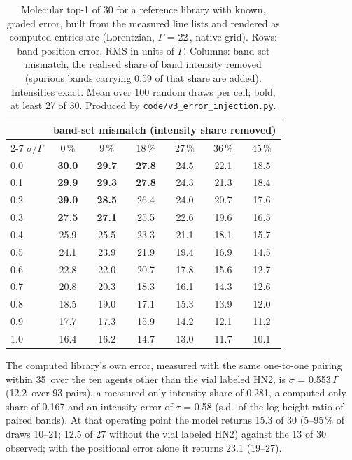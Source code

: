 \begin{table}[htbp]
\centering
\caption{Molecular top-1 of 30 for a reference library with known, graded error, built from
the measured line lists and rendered as computed entries are (Lorentzian, $\Gamma$ =
22\,\wn{}, native grid). Rows: band-position error, RMS in units of $\Gamma$. Columns:
band-set mismatch, the realised share of band intensity removed (spurious bands carrying
0.59 of that share are added). Intensities exact. Mean over 100 random draws per cell; bold,
at least 27 of 30. Produced by \texttt{code/v3\_error\_injection.py}.}
\label{tab:si-errinject}
\small
\begin{tabular}{lcccccc}
\toprule
 & \multicolumn{6}{c}{band-set mismatch (intensity share removed)} \\
\cmidrule(lr){2-7}
$\sigma/\Gamma$ & 0\,\% & 9\,\% & 18\,\% & 27\,\% & 36\,\% & 45\,\% \\
\midrule
0.0 & \textbf{30.0} & \textbf{29.7} & \textbf{27.8} & 24.5 & 22.1 & 18.5 \\
0.1 & \textbf{29.9} & \textbf{29.3} & \textbf{27.8} & 24.3 & 21.3 & 18.4 \\
0.2 & \textbf{29.0} & \textbf{28.5} & 26.4 & 24.0 & 20.7 & 17.6 \\
0.3 & \textbf{27.5} & \textbf{27.1} & 25.5 & 22.6 & 19.6 & 16.5 \\
0.4 & 25.9 & 25.5 & 23.3 & 21.1 & 18.1 & 15.7 \\
0.5 & 24.1 & 23.9 & 21.9 & 19.4 & 16.9 & 14.5 \\
0.6 & 22.8 & 22.0 & 20.7 & 17.8 & 15.6 & 12.7 \\
0.7 & 20.8 & 20.3 & 18.3 & 16.1 & 14.3 & 12.6 \\
0.8 & 18.5 & 19.0 & 17.1 & 15.3 & 13.9 & 12.0 \\
0.9 & 17.7 & 17.3 & 15.9 & 14.2 & 12.1 & 11.2 \\
1.0 & 16.4 & 16.2 & 14.7 & 13.0 & 11.7 & 10.1 \\
\bottomrule
\end{tabular}

\begin{flushleft}\footnotesize The computed library's own error, measured with the same
one-to-one pairing within 35\,\wn{} over the ten agents other than the vial labeled HN2, is
$\sigma$ = 0.553$\,\Gamma$ (12.2\,\wn{} over 93 pairs), a measured-only intensity share of
0.281, a computed-only share of 0.167 and an intensity error of $\tau$ = 0.58 (s.d.\ of the
log height ratio of paired bands). At that operating point the model returns 15.3 of 30
(5--95\,\% of draws 10--21; 12.5 of 27 without the vial labeled HN2) against the 13 of
30 observed; with the positional error alone it returns 23.1 (19--27).\end{flushleft}
\end{table}
